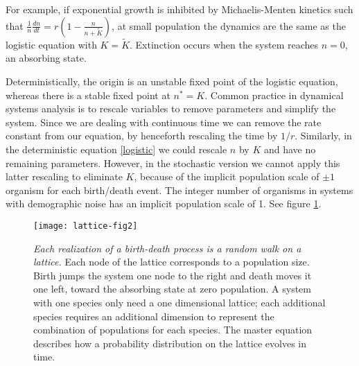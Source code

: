 For example, if exponential growth is inhibited by Michaelis-Menten kinetics such that $\frac{1}{n}\frac{dn}{dt} = r\left(1-\frac{n}{n+\tilde{K}}\right)$, at small population the dynamics are the same as the logistic equation with $K=\tilde{K}$. 
Extinction occurs when the system reaches $n=0$, an absorbing state. %

Deterministically, the origin is an unstable fixed point of the logistic equation, whereas there is a stable fixed point at $n^*=K$. 
Common practice in dynamical systems analysis is to rescale variables to remove parameters and simplify the system. 
Since we are dealing with continuous time we can remove the rate constant from our equation, by henceforth rescaling the time by $1/r$. 
Similarly, in the deterministic equation \ref{logistic} we could rescale $n$ by $K$ and have no remaining parameters. 
However, in the stochastic version we cannot apply this latter rescaling to eliminate $K$, because of the implicit population scale of $\pm1$ organism for each birth/death event. 
The integer number of organisms in systems with demographic noise has an implicit population scale of 1. 
See figure \ref{latticefig}. 

\begin{figure}[h]
	\centering
	\texttt{[image: lattice-fig2]}
	\caption{\emph{Each realization of a birth-death process is a random walk on a lattice.} Each node of the lattice corresponds to a population size. Birth jumps the system one node to the right and death moves it one left, toward the absorbing state at zero population. A system with one species only need a one dimensional lattice; each additional species requires an additional dimension to represent the combination of populations for each species. The master equation describes how a probability distribution on the lattice evolves in time. 
	} \label{latticefig}
\end{figure}

